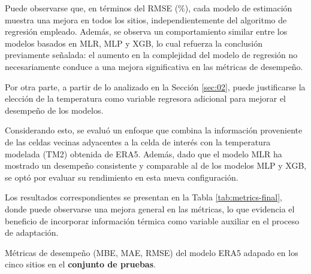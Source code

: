\documentclass[letterpaper,12pt, twoside]{report}
\providecommand{\DIFdeltex}[1]{{\protect\color{red} \scriptsize #1}} %
\providecommand{\DIFdelFL}[1]{\DIFdel{#1}} %
\providecommand{\DIFdel}[1]{\texorpdfstring{\DIFdeltex{#1}}{}} %
\begin{document}
\DIFdel{Puede observarse que, en términos del RMSE (\%), cada modelo de estimación muestra una mejora en todos los sitios, independientemente del algoritmo de regresión empleado. Además, se observa un comportamiento similar entre los modelos basados en MLR, MLP y XGB, lo cual refuerza la conclusión previamente señalada: el aumento en la complejidad del modelo de regresión no necesariamente conduce a una mejora significativa en las métricas de desempeño.
}%

\DIFdel{Por otra parte, a partir de lo analizado en la Sección \ref{sec:02}, puede justificarse la elección de la temperatura como variable regresora adicional para mejorar el desempeño de los modelos.
}%

\DIFdel{Considerando esto, se evaluó un enfoque que combina la información proveniente de las celdas vecinas adyacentes a la celda de interés con la temperatura modelada (TM2) obtenida de ERA5. Además, dado que el modelo MLR ha mostrado un desempeño consistente y comparable al de los modelos MLP y XGB, se optó por evaluar su rendimiento en esta nueva configuración.
}%

\DIFdel{Los resultados correspondientes se presentan en la Tabla \ref{tab:metrics-final}, donde puede observarse una mejora general en las métricas, lo que evidencia el beneficio de incorporar información térmica como variable auxiliar en el proceso de adaptación.
}%


{%
\DIFdelFL{Métricas de desempeño (MBE, MAE, RMSE) del modelo ERA5 adapado en los cinco sitios en el \textbf{conjunto de pruebas}.}}
\end{document}
